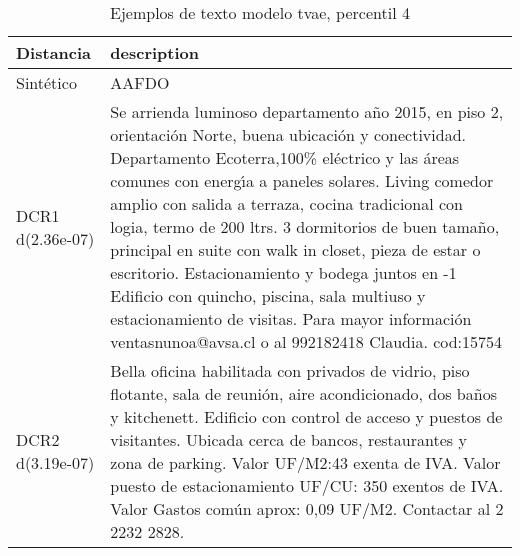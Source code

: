 \begin{table}[H]
\centering
\fontsize{10}{14}\selectfont
\caption{Ejemplos de texto modelo tvae, percentil 4}
\label{table-example-economicos-a-1-tvae-4p-text}
\begin{tabular}{|l|m{35em}|}
\hline
\rowcolor[gray]{0.8}
Distancia & description \\
\hline Sintético & AAFDO \\
\hline DCR1 d(2.36e-07) & Se arrienda luminoso departamento a\~no 2015, en piso 2, orientaci\'on Norte, buena ubicaci\'on y conectividad. Departamento Ecoterra,100\% el\'ectrico y las \'areas comunes con energ{\'\i}a a paneles solares. Living comedor amplio con salida a terraza, cocina tradicional con logia, termo de 200 ltrs. 3 dormitorios de buen tama\~no, principal en suite con walk in closet, pieza de estar o escritorio. Estacionamiento y bodega juntos en -1 Edificio con quincho, piscina, sala multiuso y estacionamiento de visitas.  Para mayor informaci\'on ventasnunoa@avsa.cl o al 992182418 Claudia. cod:15754 \\
\hline DCR2 d(3.19e-07) & Bella oficina habilitada con privados de vidrio, piso flotante, sala de reuni\'on, aire acondicionado, dos ba\~nos y kitchenett. Edificio con control de acceso y puestos de visitantes. Ubicada cerca de bancos, restaurantes y zona de parking.  Valor UF/M2:43 exenta de IVA. Valor puesto de estacionamiento UF/CU: 350 exentos de IVA. Valor Gastos com\'un aprox: 0,09 UF/M2.  Contactar al 2 2232 2828. \\
\hline
\end{tabular}
\end{table}
